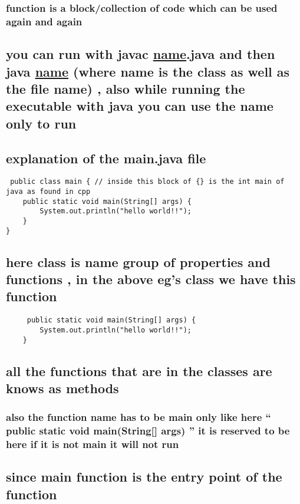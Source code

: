 \documentclass[11pt]{article}
\begin{document}
\subsubsection{function is a block/collection of code which can be used again and again}
\label{sec:org9f25dbd}
\subsection{you can run with javac \underline{name}.java and then java \underline{name} (where name is the class as well as the file name) , also while running the executable with java you can use the name only to run}
\label{sec:orge8ce8be}
\subsection{explanation of the main.java file}
\label{sec:orga925109}

\begin{verbatim}
 public class main { // inside this block of {} is the int main of java as found in cpp
	public static void main(String[] args) {
		System.out.println("hello world!!");
	}
}
\end{verbatim}

\subsection{here class is name group of properties and functions , in the above eg's class we have this function}
\label{sec:orgf4701fe}
\begin{verbatim}
	 public static void main(String[] args) {
		System.out.println("hello world!!");
	}
\end{verbatim}

\subsection{all the functions that are in the classes are knows as methods}
\label{sec:org279ec73}
\subsubsection{also the function name has to be main only like here `` public static void main(String[] args) '' it is reserved to be here if it is not main it will not run}
\label{sec:org46d7d3d}
\subsection{since main function is the entry point of the function}
\label{sec:org7ca5cd0}
\end{document}

